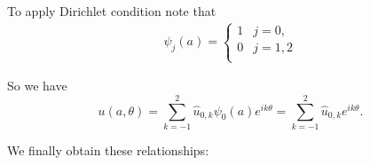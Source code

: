 To apply Dirichlet condition note that
\begin{eqnarray}
\psi_j(a) = \left \{
    \begin{array}{ll}
    1 & j = 0, \\
    0 & j = 1, 2 \\
    \end{array} \right.
\end{eqnarray}

So we have
\begin{equation}
u(a, \theta) = \sum_{k=-1}^2 \hat u_{0,k} \psi_0(a) e^{ik\theta}  = \sum_{k=-1}^2 \hat u_{0,k} e^{ik\theta}.
\end{equation}

We finally obtain these relationships:

